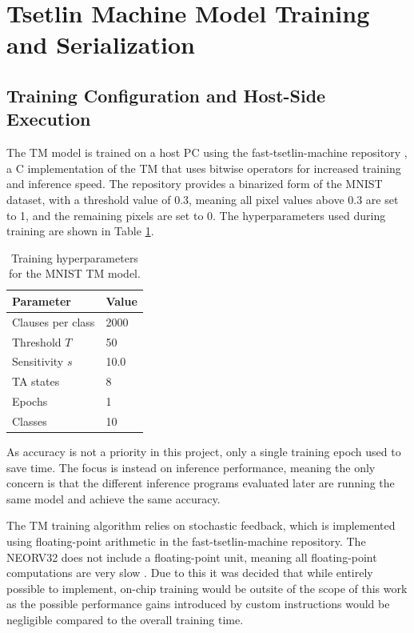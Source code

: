 \section{Tsetlin Machine Model Training and Serialization}
\label{sec:model_rep}

\subsection{Training Configuration and Host-Side Execution}
\label{sec:training_config}

The TM model is trained on a host PC using the fast-tsetlin-machine repository \cite{cair_fast_tm_mnist}, a C implementation of the TM that uses bitwise operators for increased training and inference speed. The repository provides a binarized form of the MNIST dataset, with a threshold value of 0.3, meaning all pixel values above 0.3 are set to 1, and the remaining pixels are set to 0. The hyperparameters used during training are shown in Table \ref{tab:tm_hyperparams}.

\begin{table}[H]
\centering
\caption{Training hyperparameters for the MNIST TM model.}
\label{tab:tm_hyperparams}
\begin{tabular}{ll}
\hline
Parameter & Value \\ \hline
Clauses per class & 2000 \\
Threshold $T$ & 50 \\
Sensitivity $s$ & 10.0 \\
TA states & 8 \\
Epochs & 1 \\
Classes & 10 \\ \hline
\end{tabular}
\end{table}

As accuracy is not a priority in this project, only a single training epoch used to save time. The focus is instead on inference performance, meaning the only concern is that the different inference programs evaluated later are running the same model and achieve the same accuracy.

The TM training algorithm relies on stochastic feedback, which is implemented using floating-point arithmetic in the fast-tsetlin-machine repository. The NEORV32 does not include a floating-point unit, meaning all floating-point computations are very slow \cite{Nolting2024Datasheet}. Due to this it was decided that while entirely possible to implement, on-chip training would be outsite of the scope of this work as the possible performance gains introduced by custom instructions would be negligible compared to the overall training time.


